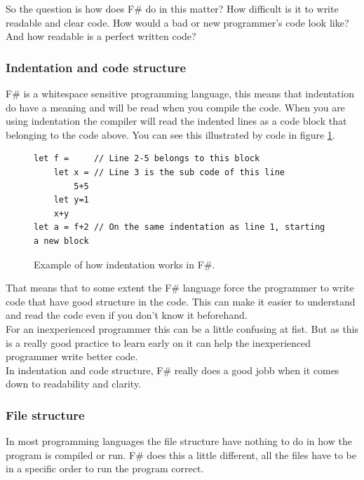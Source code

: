 \documentclass[12pt, a4paper]{article}
\begin{document}
So the question is how does F\# do in this matter? How difficult is it to write readable and clear code. How would a bad or new programmer's code look like? And how readable is a perfect written code?

\newpage
\subsubsection{Indentation and code structure}
\label{indentationAndCodeStructure}
F\# is a whitespace sensitive programming language, this means that indentation do have a meaning and will be read when you compile the code. When you are using indentation the compiler will read the indented lines as a code block that belonging to the code above. You can see this illustrated by code in figure \ref{fig:indentationExample}.

\begin{figure}[!h]
	\begin{lstlisting}
let f = 	// Line 2-5 belongs to this block
	let x = // Line 3 is the sub code of this line
		5+5	
	let y=1
  	x+y
let a = f+2	// On the same indentation as line 1, starting a new block
	\end{lstlisting}
	\caption{Example of how indentation works in F\#.}
	\label{fig:indentationExample}
\end{figure}

That means that to some extent the F\# language force the programmer to write code that have good structure in the code. This can make it easier to understand and read the code even if you don't know it beforehand.\\

For an inexperienced programmer this can be a little confusing at fist. But as this is a really good practice to learn early on it can help the inexperienced programmer write better code.\\

In indentation and code structure, F\# really does a good jobb when it comes down to readability and clarity.

\newpage
\subsubsection{File structure}

In most programming languages the file structure have nothing to do in how the program is compiled or run. F\# does this a little different, all the files have to be in a specific order to run the program correct.\\
\end{document}
